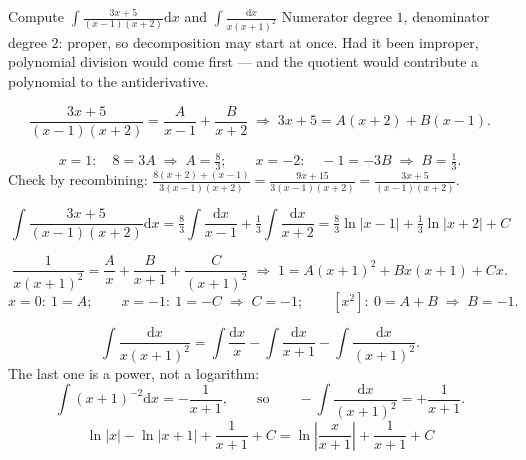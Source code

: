 \begin{worked}{Compute $\displaystyle\int\frac{3x+5}{(x-1)(x+2)}\mathrm{d}x$ and $\displaystyle\int\frac{\mathrm{d}x}{x(x+1)^{2}}$}
Numerator degree $1$, denominator degree $2$: proper, so decomposition may
start at once. Had it been improper, polynomial division would come first
--- and the quotient would contribute a polynomial to the antiderivative.

\[
  \frac{3x+5}{(x-1)(x+2)}=\frac{A}{x-1}+\frac{B}{x+2}
  \;\Longrightarrow\;
  3x+5=A(x+2)+B(x-1).
\]

\[
  x=1:\quad 8=3A \;\Rightarrow\; A=\tfrac83 ;
  \qquad
  x=-2:\quad -1=-3B \;\Rightarrow\; B=\tfrac13 .
\]
Check by recombining: $\frac{8(x+2)+(x-1)}{3(x-1)(x+2)}
=\frac{9x+15}{3(x-1)(x+2)}=\frac{3x+5}{(x-1)(x+2)}$. \checkmark

\[
  \int\frac{3x+5}{(x-1)(x+2)}\mathrm{d}x
  =\tfrac83\int\frac{\mathrm{d}x}{x-1}+\tfrac13\int\frac{\mathrm{d}x}{x+2}
  =\boxed{\tfrac83\ln|x-1|+\tfrac13\ln|x+2|+C}
\]

\[
  \frac{1}{x(x+1)^{2}}=\frac{A}{x}+\frac{B}{x+1}+\frac{C}{(x+1)^{2}}
  \;\Longrightarrow\;
  1=A(x+1)^{2}+Bx(x+1)+Cx .
\]
\[
  x=0:\ 1=A ;
  \qquad
  x=-1:\ 1=-C \;\Rightarrow\; C=-1 ;
  \qquad
  [x^{2}]:\ 0=A+B \;\Rightarrow\; B=-1 .
\]

\[
  \int\frac{\mathrm{d}x}{x(x+1)^{2}}
  =\int\frac{\mathrm{d}x}{x}-\int\frac{\mathrm{d}x}{x+1}-\int\frac{\mathrm{d}x}{(x+1)^{2}} .
\]
The last one is a power, not a logarithm:
\[
  \int(x+1)^{-2}\mathrm{d}x=-\frac{1}{x+1} ,
  \qquad\text{so}\qquad
  -\int\frac{\mathrm{d}x}{(x+1)^{2}}=+\frac{1}{x+1} .
\]
\[
  \boxed{\ln|x|-\ln|x+1|+\frac{1}{x+1}+C
        =\ln\left|\frac{x}{x+1}\right|+\frac{1}{x+1}+C}
\]


\end{worked}
